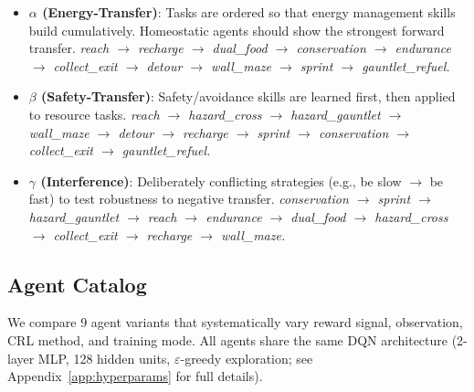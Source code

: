 \documentclass{article}
\begin{document}
\begin{itemize}[leftmargin=*,topsep=1pt,itemsep=1pt]
  \item \textbf{$\alpha$ (Energy-Transfer)}: Tasks are ordered so that
        energy management skills build cumulatively. Homeostatic agents should
        show the strongest forward transfer.
        \emph{reach $\to$ recharge $\to$ dual\_food $\to$ conservation $\to$
        endurance $\to$ collect\_exit $\to$ detour $\to$ wall\_maze $\to$
        sprint $\to$ gauntlet\_refuel.}

  \item \textbf{$\beta$ (Safety-Transfer)}: Safety/avoidance skills are
        learned first, then applied to resource tasks.
        \emph{reach $\to$ hazard\_cross $\to$ hazard\_gauntlet $\to$
        wall\_maze $\to$ detour $\to$ recharge $\to$ sprint $\to$
        conservation $\to$ collect\_exit $\to$ gauntlet\_refuel.}

  \item \textbf{$\gamma$ (Interference)}: Deliberately conflicting
        strategies (e.g., be slow $\to$ be fast) to test robustness
        to negative transfer.
        \emph{conservation $\to$ sprint $\to$ hazard\_gauntlet $\to$
        reach $\to$ endurance $\to$ dual\_food $\to$ hazard\_cross $\to$
        collect\_exit $\to$ recharge $\to$ wall\_maze.}
\end{itemize}

\subsection{Agent Catalog}

We compare 9 agent variants that systematically vary reward signal,
observation, CRL method, and training mode. All agents share the same
DQN architecture (2-layer MLP, 128 hidden units, $\varepsilon$-greedy
exploration; see Appendix~\ref{app:hyperparams} for full details).
\end{document}

